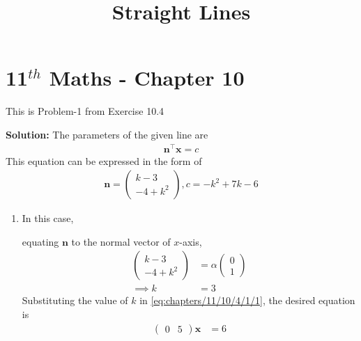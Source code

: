 \documentclass[12pt]{article}
\newcommand{\solution}{\noindent \textbf{Solution: }}
\newcommand{\myvec}[1]{\ensuremath{\begin{pmatrix}#1\end{pmatrix}}}
\let\vec\mathbf
\begin{document}
\begin{center}
\enlargethispage{-4cm}
\title{\textbf{Straight Lines}}
\date{\vspace{-5ex}} %
\maketitle
\end{center}
\setcounter{page}{1}
\section*{11$^{th}$ Maths - Chapter 10}
This is Problem-1 from Exercise 10.4
\begin{enumerate}

\solution
\fi
The parameters of the given line are
\begin{align}
\vec{n}^{\top}\vec{x}=c \label{eq:chapters/11/10/4/1/2}
\end{align}
This equation can be expressed in the form of 
\begin{align}
\vec{n} = \myvec{k-3\\-4+k^2}, c  = -k^2+7k-6
\end{align}
\iffalse
Then \eqref{eq:chapters/11/10/4/1/1} can be expressed as
\begin{align}
\myvec{k-3 & -4+k^2}\vec{x} &=-k^2+7k-6\label{eq:chapters/11/10/4/1/4}
\end{align}
\fi
\begin{enumerate}
    \item 
	    In this case,
	    \iffalse
The normal vector of $x$-axis is given by
\begin{align}
\myvec{0\\1}
\end{align}
\fi
equating $\vec{n}$ to the normal vector of $x$-axis,
\begin{align}
\myvec{k-3\\-4+k^2} &=\alpha\myvec{0\\1}\label{eq:chapters/11/10/4/1/6}
\\
\implies
k &=3
\end{align}
Substituting the value of $k$ in \eqref{eq:chapters/11/10/4/1/1}, the desired equation is
\begin{align}
        \myvec{0 & 5}\vec{x} &=6
\end{align}


\end{enumerate}
\end{enumerate}
\end{document}
